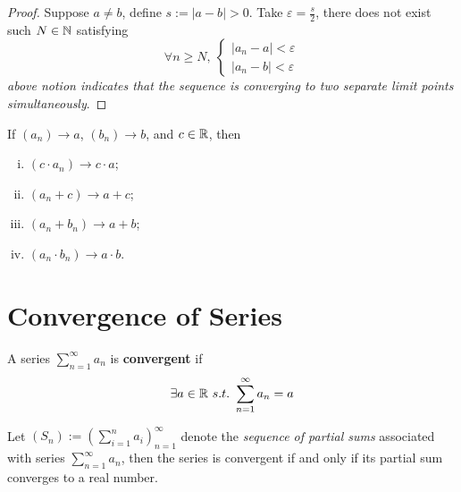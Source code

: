 \documentclass[11pt]{article}
\newcommand{\ser}[2]{\sum_{{#2}=1}^\infty {#1}_{#2}}
\begin{document}
        \begin{proof}
            Suppose $a \neq b$, define $s:= |a-b| > 0$. Take $\varepsilon = \frac{s}{2}$, there does not exist such $N \in \mathbb{N}$ satisfying 
            \begin{equation}
                \forall n \geq N,\ 
                \begin{cases}
                    |a_n - a| < \varepsilon \\
                    |a_n - b| < \varepsilon
                \end{cases}
            \end{equation}
            \emph{above notion indicates that the sequence is converging to two separate limit points simultaneously}.
        \end{proof}
        
        \begin{theorem}
            If $(a_n) \to a$, $(b_n) \to b$, and $c \in \mathbb{R}$, then
            \begin{enumerate}[(i)]
                \item $(c \cdot a_n) \to c \cdot a$;
                \item $(a_n + c) \to a + c$;
                \item $(a_n + b_n) \to a + b$;
                \item $(a_n \cdot b_n) \to a \cdot b$.
            \end{enumerate}
        \end{theorem}
        
    \section{Convergence of Series}
        \begin{definition}
            A series $\ser{a}{n}$ is \textbf{convergent} if
            \begin{equation}
                \exists a \in \R\ s.t.\ \ser{a}{n} = a
            \end{equation}
        \end{definition}
        
        \begin{definition}
            Let $(S_n) := (\sum_{i=1}^n a_i)_{n=1}^\infty$ denote the \emph{sequence of partial sums} associated with series $\ser{a}{n}$, then the series is convergent if and only if its partial sum converges to a real number.
        \end{definition}
        
\end{document}
